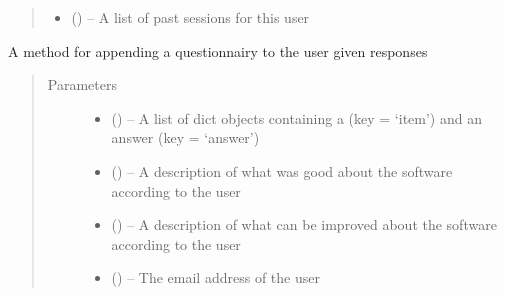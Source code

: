 \documentclass[letterpaper,10pt,english]{sphinxmanual}
\begin{document}
\begin{fulllineitems}
\begin{quote}
\begin{description}
\begin{itemize}
\item {} 
 ({\hyperref[\detokenize{session:session.Session}]{}}) -- A list of past sessions for this user

\end{itemize}

\end{description}\end{quote}

\begin{fulllineitems}
\label{\detokenize{user:user.User.append_questionnaire}}
A method for appending a questionnairy to the user given responses
\begin{quote}\begin{description}
\item[{Parameters}] \leavevmode\begin{itemize}
\item {} 
 (\href{https://docs.python.org/2/library/stdtypes.html\#dict}{}) -- A list of dict objects containing a  (key = `item') and an answer (key = `answer')

\item {} 
 (\href{https://docs.python.org/2/library/string.html\#module-string}{}) -- A description of what was good about the software according to the user

\item {} 
 (\href{https://docs.python.org/2/library/string.html\#module-string}{}) -- A description of what can be improved about the software according to the user

\item {} 
 (\href{https://docs.python.org/2/library/string.html\#module-string}{}) -- The email address of the user

\end{itemize}

\end{description}\end{quote}


\end{fulllineitems}
\end{fulllineitems}
\end{document}
